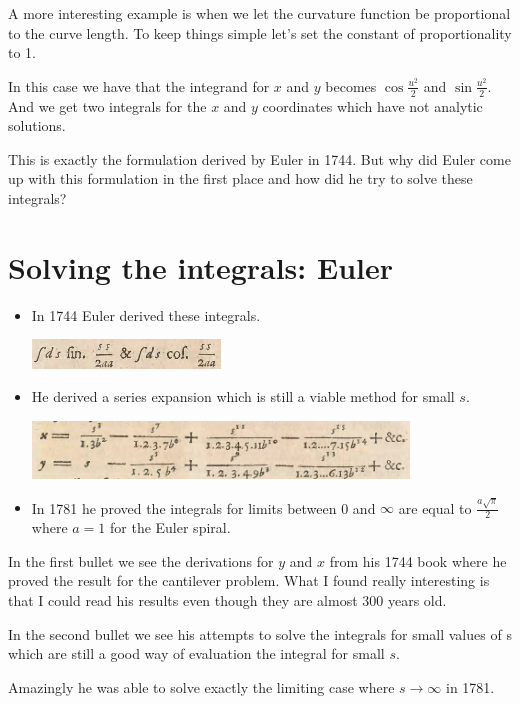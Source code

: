 \documentclass[12pt]{article} %
\theoremstyle{definition}
\theoremstyle{theorem}
\begin{document}
A more interesting example is when we let the curvature function be proportional to the curve length. To keep things simple let's set the constant of proportionality to 1.

In this case we have that the integrand for $x$ and $y$ becomes $\cos \frac{u^2}{2}$ and $\sin \frac{u^2}{2}$. And we get two integrals for the $x$ and $y$ coordinates which have not analytic solutions. 

This is exactly the formulation derived by Euler in 1744. But why did Euler come up with this formulation in the first place and how did he try to solve these integrals?


\section{Solving the integrals: Euler}
\begin{tcolorbox}
	\begin{itemize}
		\item In 1744 Euler derived these integrals.
		
		\includegraphics[width=50mm, scale=0.5]{euler_scripture_1.png}	
		\item He derived a series expansion which is still a viable method for small $s$.	
		
		\includegraphics[width=100mm, scale=0.7]{euler_scripture.png}
		\item In 1781 he proved the integrals for limits between 0 and $\infty$ are equal to  $\frac{a \sqrt{\pi}}{2}$ where $a=1$ for the Euler spiral.
	\end{itemize}
\end{tcolorbox}

In the first bullet we see the derivations for $y$ and $x$ from his 1744 book where he proved the result for the cantilever problem. What I found really interesting is that I could read his results even though they are almost 300 years old.

In the second bullet we see his attempts to solve the integrals for small values of s which are still a good way of evaluation the integral for small $s$.

Amazingly he was able to solve exactly the limiting case where $s \to \infty$ in 1781. 
\end{document}
